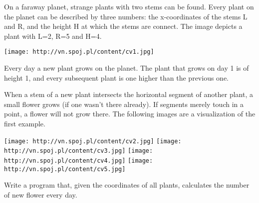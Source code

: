 On a faraway planet, strange plants with two stems can be found. Every plant on the planet can be described by three numbers: the x-coordinates of the stems L and R, and the height H at which the stems are connect. The image depicts a plant with L=2, R=5 and H=4.  


\texttt{[image: http://vn.spoj.pl/content/cv1.jpg]}

   Every day a new plant grows on the planet. The plant that grows on day 1 is of height 1, and every subsequent plant is one higher than the previous one.  

   When a stem of a new plant intersects the horizontal segment of another plant, a small flower grows (if one wasn't there already). If segments merely touch in a point, a flower will not grow there. The following images are a visualization of the first example.  


\texttt{[image: http://vn.spoj.pl/content/cv2.jpg]}
\texttt{[image: http://vn.spoj.pl/content/cv3.jpg]}
\texttt{[image: http://vn.spoj.pl/content/cv4.jpg]}
\texttt{[image: http://vn.spoj.pl/content/cv5.jpg]}

   Write a program that, given the coordinates of all plants, calculates the number of new flower every day.